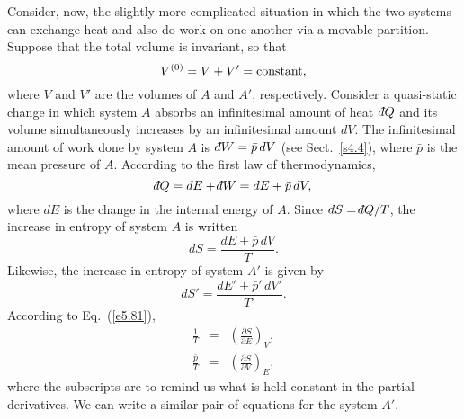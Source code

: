 Consider, now, the  slightly more complicated situation in which the two systems can
exchange heat and also do work on one another via a movable partition.
Suppose that the total volume is invariant, so that
\begin{equation}
V^{(0)} = V + V' = {\rm constant},\label{e5.79}
\end{equation}
where $V$ and $V'$ are the volumes of $A$ and $A'$, respectively.
 Consider a 
quasi-static change in which system $A$ absorbs an infinitesimal
amount of heat $\,\dbar Q$ 
and its volume simultaneously increases by an infinitesimal amount
$dV$. The infinitesimal 
amount of work done by system $A$ is  $\,\dbar W = \bar{p}\,dV$ 
(see Sect.~\ref{s4.4}), where $\bar{p}$ is the mean pressure of $A$.
 According to the first law of thermodynamics,
\begin{equation}
\dbar Q = d E + \dbar W = dE + \bar{p}\,dV,
\end{equation}
where $dE$ is the change in the internal energy of $A$. Since $dS = \dbar Q/T$, 
the increase in entropy of system $A$  is written
\begin{equation}
d S = \frac{ dE + \bar{p}\,dV}{T}.\label{e5.81}
\end{equation}
Likewise, the increase  in entropy of system $A'$ is given by
\begin{equation}
d S' = \frac{ dE' + \bar{p}'\,dV'}{T'}.
\end{equation}
According to Eq.~(\ref{e5.81}),
\begin{eqnarray}\label{e5.83}
\frac{1}{T} &=&\left(\frac{\partial S}{\partial E}\right)_V,\\
\frac{\bar{p}}{T} &=& \left(\frac{\partial S}{\partial V}\right)_{E},\label{e5.83a}
\end{eqnarray}
where the subscripts are to remind us what is
 held constant in the partial derivatives.
We can write a similar pair of equations for the system $A'$. 


